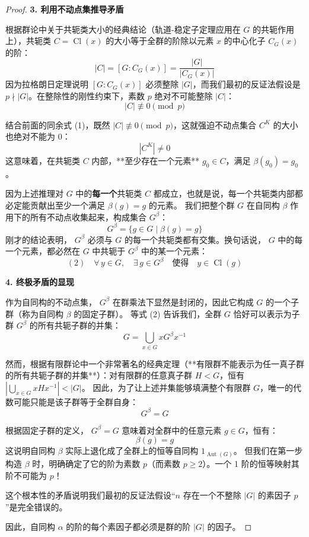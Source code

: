 \documentclass[]{article}
\begin{document}
\begin{proof}
\bigskip
\noindent \textbf{3. 利用不动点集推导矛盾}

根据群论中关于共轭类大小的经典结论（轨道-稳定子定理应用在 $G$ 的共轭作用上），共轭类 $C = \operatorname{Cl}(x)$ 的大小等于全群的阶除以元素 $x$ 的中心化子 $C_G(x)$ 的阶：
\[ |C| = [G : C_G(x)] = \frac{|G|}{|C_G(x)|} \]
因为拉格朗日定理说明 $[G : C_G(x)]$ 必须整除 $|G|$，而我们最初的反证法假设是 $p \nmid |G|$。在整除性的刚性约束下，素数 $p$ 绝对不可能整除 $|C|$：
\[ |C| \not\equiv 0 \pmod p \]

结合前面的同余式 (1)，既然 $|C| \not\equiv 0 \pmod p$，这就强迫不动点集合 $C^K$ 的大小也绝对不能为 0：
\[ |C^K| \neq 0 \]
这意味着，在共轭类 $C$ 内部，**至少存在一个元素** $g_0 \in C$，满足 $\beta(g_0) = g_0$。

因为上述推理对 $G$ 中的\textbf{每一个}共轭类 $C$ 都成立，也就是说，每一个共轭类内部都必定能贡献出至少一个满足 $\beta(g) = g$ 的元素。
我们把整个群 $G$ 在自同构 $\beta$ 作用下的所有不动点收集起来，构成集合 $G^\beta$：
\[ G^\beta = \{ g \in G \mid \beta(g) = g \} \]
刚才的结论表明， $G^\beta$ 必须与 $G$ 的每一个共轭类都有交集。换句话说， $G$ 中的每一个元素，都必然在 $G$ 中共轭于 $G^\beta$ 中的某一个元素：
\[ (2) \quad \forall \, y \in G, \quad \exists \, g \in G^\beta \quad \text{使得} \quad y \in \operatorname{Cl}(g) \]

\bigskip
\noindent \textbf{4. 终极矛盾的显现}

作为自同构的不动点集， $G^\beta$ 在群乘法下显然是封闭的，因此它构成 $G$ 的一个子群（称为自同构 $\beta$ 的固定子群）。
等式 (2) 告诉我们，全群 $G$ 恰好可以表示为子群 $G^\beta$ 的所有共轭子群的并集：
\[ G = \bigcup_{x \in G} x G^\beta x^{-1} \]

然而，根据有限群论中一个非常著名的经典定理（**有限群不能表示为任一真子群的所有共轭子群的并集**）：对有限群的任意真子群 $H < G$，恒有 $\left| \bigcup_{x \in G} xHx^{-1} \right| < |G|$。
因此，为了让上述并集能够填满整个有限群 $G$，唯一的代数可能只能是该子群等于全群自身：
\[ G^\beta = G \]

根据固定子群的定义， $G^\beta = G$ 意味着对全群中的任意元素 $g \in G$，恒有：
\[ \beta(g) = g \]
这说明自同构 $\beta$ 实际上退化成了全群上的恒等自同构 $1_{\operatorname{Aut}(G)}$。
但我们在第一步构造 $\beta$ 时，明确确定了它的阶为素数 $p$（而素数 $p \ge 2$）。一个 1 阶的恒等映射其阶不可能为 $p$！

这个根本性的矛盾说明我们最初的反证法假设“$n$ 存在一个不整除 $|G|$ 的素因子 $p$”是完全错误的。

因此，自同构 $\alpha$ 的阶的每个素因子都必须是群的阶 $|G|$ 的因子。


\end{proof}
\end{document}

